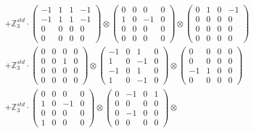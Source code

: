 \documentclass{article}
\begin{document}
{\begin{align}
        &+ \label{Rs16-Rc11-Solution-2-c22} \mathbb{Z}_3^{std} \cdot 
            \begin{pmatrix} -1 & 1 & 1 & -1 \\ -1 & 1 & 1 & -1 \\ 0 & 0 & 0 & 0 \\ 0 & 0 & 0 & 0 \end{pmatrix} \otimes 
            \begin{pmatrix} 0 & 0 & 0 & 0 \\ 1 & 0 & -1 & 0 \\ 0 & 0 & 0 & 0 \\ 0 & 0 & 0 & 0 \end{pmatrix} \otimes 
            \begin{pmatrix} 0 & 1 & 0 & -1 \\ 0 & 0 & 0 & 0 \\ 0 & 0 & 0 & 0 \\ 0 & 0 & 0 & 0 \end{pmatrix} \\ 
        &+ \label{Rs16-Rc11-Solution-2-c23} \mathbb{Z}_3^{std} \cdot 
            \begin{pmatrix} 0 & 0 & 0 & 0 \\ 0 & 0 & 1 & 0 \\ 0 & 0 & 0 & 0 \\ 0 & 0 & 0 & 0 \end{pmatrix} \otimes 
            \begin{pmatrix} -1 & 0 & 1 & 0 \\ 1 & 0 & -1 & 0 \\ -1 & 0 & 1 & 0 \\ 1 & 0 & -1 & 0 \end{pmatrix} \otimes 
            \begin{pmatrix} 0 & 0 & 0 & 0 \\ 0 & 0 & 0 & 0 \\ -1 & 1 & 0 & 0 \\ 0 & 0 & 0 & 0 \end{pmatrix} \\ 
        &+ \label{Rs16-Rc11-Solution-2-c24} \mathbb{Z}_3^{std} \cdot 
            \begin{pmatrix} 0 & 0 & 0 & 0 \\ 1 & 0 & -1 & 0 \\ 0 & 0 & 0 & 0 \\ 1 & 0 & 0 & 0 \end{pmatrix} \otimes 
            \begin{pmatrix} 0 & -1 & 0 & 1 \\ 0 & 0 & 0 & 0 \\ 0 & -1 & 0 & 0 \\ 0 & 0 & 0 & 0 \end{pmatrix} \otimes 

\end{align}}
\end{document}
